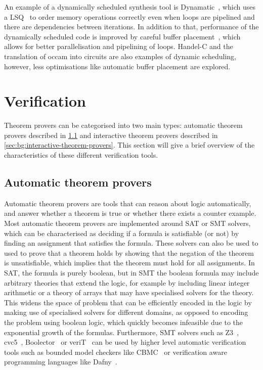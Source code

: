 An example of a dynamically scheduled synthesis tool is
Dynamatic~\cite{josipović18_dynam_sched_high_synth}, which uses a
\gls{LSQ}~\cite{josipović17_out_order_load_store_queue_spatial_comput} to order
memory operations correctly even when loops are pipelined and there are
dependencies between iterations.  In addition to that, performance of the
dynamically scheduled code is improved by careful buffer
placement~\cite{josipović21_buffer_placem_sizin_high_perfor_dataf_circuit},
which allows for better parallelisation and pipelining of loops.
Handel-C and the translation of occam into circuits are also examples of dynamic scheduling, however, less optimisations like automatic buffer placement are explored.

\section{Verification}%
\label{sec:bg:verification}

Theorem provers can be categorised into two main types: automatic theorem
provers described in \cref{sec:bg:automatic-theorem-provers} and interactive
theorem provers described in \cref{sec:bg:interactive-theorem-provers}.  This
section will give a brief overview of the characteristics of these different
verification tools.

\subsection{Automatic theorem provers}%
\label{sec:bg:automatic-theorem-provers}

Automatic theorem provers are tools that can reason about logic automatically,
and answer whether a theorem is true or whether there
exists a counter example.  Most automatic theorem provers are implemented around
\gls{SAT} or \gls{SMT} solvers, which can be characterised as deciding if a
formula is satisfiable (or not) by finding an assignment that satisfies the
formula.  These solvers can also be used to used to prove that a theorem holds
by showing that the negation of the theorem is unsatisfiable, which implies
that the theorem must hold for all assignments.  In \gls{SAT}, the formula is
purely boolean, but in \gls{SMT} the boolean formula may include arbitrary
theories that extend the logic, for example by including linear integer
arithmetic or a theory of arrays that may have specialised solvers for the
theory.  This widens the space of problem that can be efficiently encoded in the
logic by making use of specialised solvers for different domains, as opposed to
encoding the problem using boolean logic, which quickly becomes infeasible due
to the exponential growth of the formulas.  Furthermore, \gls{SMT} solvers such
as Z3~\cite[]{moura08_z}, cvc5~\cite[]{barbosa22_cvc5},
Boolector~\cite[]{brummayer09_b} or veriT~\cite{bouton09} can be used by higher
level automatic verification tools such as bounded model checkers like
CBMC~\cite[]{kroening14_c} or verification aware programming languages like
Dafny~\cite[]{leino10_d}.

